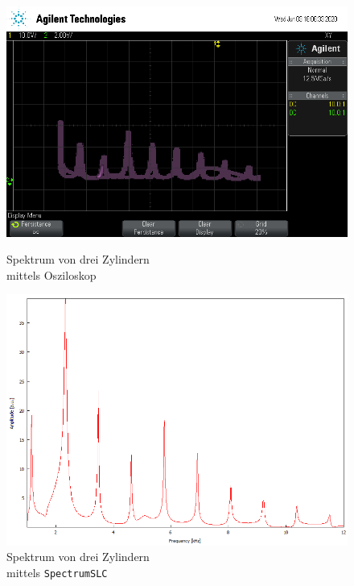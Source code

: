 \begin{figure}
    \begin{minipage}[b]{.4\linewidth} %
        \includegraphics[width=\linewidth]{figure/3Zylinder.png}
        \vspace*{0.008cm}
        \caption{Spektrum von drei Zylindern\\ mittels Osziloskop}
     \end{minipage}
     \hspace{.1\linewidth}%
     \begin{minipage}[b]{.4\linewidth} %
        \includegraphics[width=\linewidth]{figure/3_Zylinder.png}
        \caption{Spektrum von drei Zylindern\\ mittels \texttt{SpectrumSLC}}
     \end{minipage}
\end{figure}
